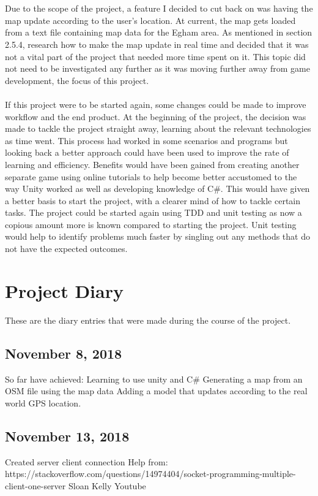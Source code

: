 \documentclass[a4paper]{report}
\begin{document}
\\\\
Due to the scope of the project, a feature I decided to cut back on was having the map update according to the user's location. At current, the map gets loaded from a text file containing map data for the Egham area. As mentioned in section 2.5.4, research how to make the map update in real time and decided that it was not a vital part of the project that needed more time spent on it. This topic did not need to be investigated any further as it was moving further away from game development, the focus of this project.
\\\\
If this project were to be started again, some changes could be made to improve workflow and the end product. At the beginning of the project, the decision was made to tackle the project straight away, learning about the relevant technologies as time went. This process had worked in some scenarios and programs but looking back a better approach could have been used to improve the rate of learning and efficiency.  Benefits would have been gained from creating another separate game using online tutorials to help become better accustomed to the way Unity worked as well as developing knowledge of C\#. This would have given a better basis to start the project, with a clearer mind of how to tackle certain tasks. The project could be started again using TDD and unit testing as now a copious amount more is known compared to starting the project. Unit testing would help to identify problems much faster by singling out any methods that do not have the expected outcomes. 
\section{Project Diary}
These are the diary entries that were made during the course of the project.
\subsection{November 8, 2018}
So far have achieved: Learning to use unity and C\# Generating a map from an OSM file using the map data Adding a model that updates according to the real world GPS location.
\subsection{November 13, 2018}
Created server client connection Help from: https://stackoverflow.com/questions/14974404/socket-programming-multiple-client-one-server Sloan Kelly Youtube
\end{document}

